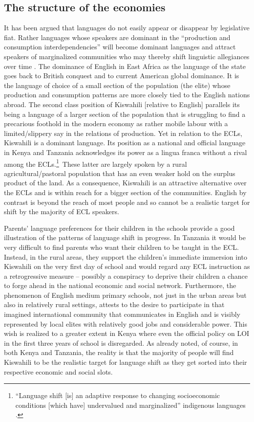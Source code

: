 \documentclass[output=paper,colorlinks,citecolor=brown]{langscibook}
\begin{document}
\subsection{The structure of the economies} 
It has been argued that languages do not easily appear or disappear by legislative fiat. Rather languages whose speakers are dominant in the “production and consumption interdependencies” will become dominant languages and attract speakers of marginalized communities who may thereby shift linguistic allegiances over time  \citep[218]{Mufwene2004}. The dominance of English in East Africa as the language of the state goes back to British conquest and to current American global dominance. It is the language of choice of a small section of the population (the elite) whose production and consumption patterns are more closely tied to the English nations abroad. The second class position of Kiswahili [relative to English] parallels its being a language of a larger section of the population that is struggling to find a precarious foothold in the modern economy as rather mobile labour with a limited\slash slippery say in the relations of production. Yet in relation to the ECLs, Kiswahili is a dominant language. Its position as a national and official language in Kenya and Tanzania acknowledges its power as a lingua franca without a rival among the ECLs.\footnote{“Language shift [is] an adaptive response to changing socioeconomic conditions [which have] undervalued and marginalized” indigenous languages \citep[207]{Mufwene2004}.
}~These latter are largely spoken by a rural agricultural\slash pastoral population that has an even weaker hold on the surplus product of the land. As a consequence, Kiswahili is an attractive alternative over the ECLs and is within reach for a bigger section of the communities. English by contrast is beyond the reach of most people and so cannot be a realistic target for shift by the majority of ECL speakers.

Parents’ language preferences for their children in the schools provide a good illustration of the patterns of language shift in progress. In Tanzania it would be very difficult to find parents who want their children to be taught in the ECL. Instead, in the rural areas, they support the children’s immediate immersion into Kiswahili on the very first day of school and would regard any ECL instruction as a retrogressive measure – possibly a conspiracy to deprive their children a chance to forge ahead in the national economic and social network.  Furthermore, the phenomenon of English medium primary schools, not just in the urban areas but also in relatively rural settings, attests to the desire to participate in that imagined international community that communicates in English and is visibly represented by local elites with relatively good jobs and considerable power. This wish is realized to a greater extent in Kenya where even the official policy on LOI in the first three years of school is disregarded. As already noted, of course, in both Kenya and Tanzania, the reality is that the majority of people will find Kiswahili to be the realistic target for language shift as they get sorted into their respective economic and social slots.
\end{document}
